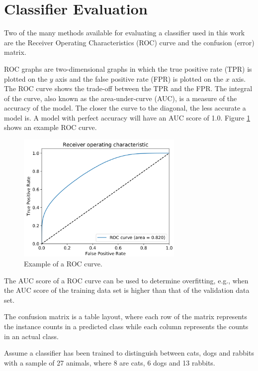 \section{Classifier Evaluation}
Two of the many methods available for evaluating a classifier used in this work are the Receiver Operating Characteristics (ROC) curve and the confusion (error) matrix.

ROC graphs are two-dimensional graphs in which the true positive rate (TPR) is plotted on the $y$ axis and the false positive rate (FPR) is plotted on the $x$ axis. The ROC curve shows the trade-off between the TPR and the FPR. The integral of the curve, also known as the area-under-curve (AUC), is a measure of the accuracy of the model. The closer the curve to the diagonal, the less accurate a model is. A model with perfect accuracy will have an AUC score of 1.0. Figure \ref{fig:ch_3_roc} shows an example ROC curve.
\begin{figure}[H]
    \centering
    \includegraphics[width=8cm]{assets/chap03/roc.png}
    \caption{Example of a ROC curve.}
    \label{fig:ch_3_roc}
\end{figure}
The AUC score of a ROC curve can be used to determine overfitting, e.g., when the AUC score of the training data set is higher than that of the validation data set.

The confusion matrix is a table layout, where each row of the matrix represents the instance counts in a predicted class while each column represents the counts in an actual class.

Assume a classifier has been trained to distinguish between cats, dogs and rabbits with a sample of 27 animals, where 8 are cats, 6 dogs and 13 rabbits.

